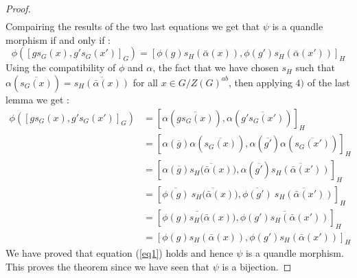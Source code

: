 \documentclass[12pt, reqno]{amsart}
\begin{document}
\begin{proof}
\begin{equation*}
\begin{split}
\end{split}
\end{equation*}
Compairing the results of the two last equations we get that $\psi$ is a quandle morphism if and only if :
\begin{equation}\label{eq1}
\phi([gs_G(x),g's_G(x')]_G)=[\phi(g)s_H(\bar{\alpha}(x)),\phi(g')s_H(\bar{\alpha}(x'))]_H
\end{equation}
Using the compatibility of $\phi$ and $\alpha$, the fact that we have chosen $s_H$ such that $\alpha(\overline{s_G(x)})=\overline{s_H(\bar{\alpha}(x))}$ for all $x\in G/Z(G)^{ab}$, then applying $4)$ of the last lemma we get :
\begin{equation}
\begin{split}
\phi([gs_G(x),g's_G(x')]_G)&=[\alpha(\overline{gs_G(x)}),\alpha(\overline{g's_G(x')})]_H \\
&= [\alpha(\overline{g}) \alpha(\overline{s_G(x)}),\alpha(\overline{g'}) \alpha(\overline{s_G(x')})]_H \\
&=[\alpha(\overline{g}) \overline{s_H(\bar{\alpha}(x)}),\alpha(\overline{g'})\overline{s_H(\bar{\alpha}(x'))}]_H \\
&=[\overline{\phi(g)} \: \overline{s_H(\bar{\alpha}(x)}),\overline{\phi(g')}\:\overline{s_H(\bar{\alpha}(x'))}]_H\\
&=[\overline{\phi(g)s_H(\bar{\alpha}(x)}),\overline{\phi(g')s_H(\bar{\alpha}(x'))}]_H\\
&=[\phi(g)s_H(\bar{\alpha}(x)),\phi(g')s_H(\bar{\alpha}(x'))]_H
\end{split}
\end{equation}
We have proved that equation (\ref{eq1}) holds and hence $\psi$ is a quandle morphism. This proves the theorem since we have seen that $\psi$ is a bijection.
\end{proof} 
\end{document}
